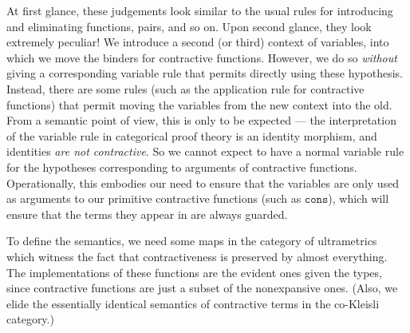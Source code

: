 \documentclass[nocopyrightspace,preprint]{sigplanconf}
\newcommand{\term}[1]{\ensuremath{\mathtt{{#1}}}}
\begin{document}
At first glance, these judgements look similar to the usual rules for
introducing and eliminating functions, pairs, and so on. Upon second
glance, they look extremely peculiar! We introduce a second (or third)
context of variables, into which we move the binders for contractive
functions. However, we do so \emph{without} giving a corresponding
variable rule that permits directly using these hypothesis. Instead,
there are some rules (such as the application rule for contractive
functions) that permit moving the variables from the new context into
the old. From a semantic point of view, this is only to be expected
--- the interpretation of the variable rule in categorical proof
theory is an identity morphism, and identities \emph{are not
  contractive}. So we cannot expect to have a normal variable rule for
the hypotheses corresponding to arguments of contractive
functions. Operationally, this embodies our need to ensure that the
variables are only used as arguments to our primitive contractive
functions (such as \term{cons}), which will ensure that the terms they
appear in are always guarded.

To define the semantics, we need some maps in the category of
ultrametrics which witness the fact that contractiveness is preserved
by almost everything. The implementations of these functions are the
evident ones given the types, since contractive functions are just a
subset of the nonexpansive ones. (Also, we elide the essentially
identical semantics of contractive terms in the co-Kleisli category.)
\end{document}

